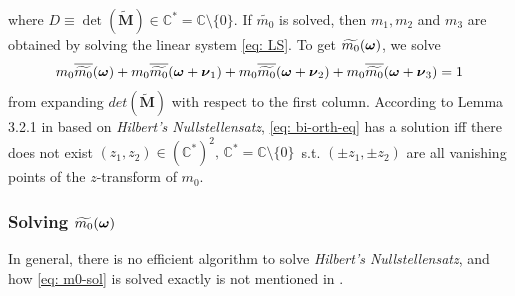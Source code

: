 where $ D \equiv \det(\widetilde{\mathbf{M}})\in \mathbb{C}^* = \mathbb{C}\setminus\{0\}$.
If $\widetilde{m_0}$ is solved, then $m_1,m_2$ and $m_3$ are obtained by solving the linear system \eqref{eq: LS}.
To get $\widetilde{m_{0}}(\boldsymbol{\omega})$, we solve 
\begin{align}\label{eq: bi-orth-eq}
m_0\overline{\widetilde{m_{0}}}(\boldsymbol{\omega}) + m_0\overline{\widetilde{m_{0}}}(\boldsymbol{\omega} + \boldsymbol{\nu}_{1}) + m_0\overline{\widetilde{m_{0}}}(\boldsymbol{\omega} + \boldsymbol{\nu}_{2}) + m_0\overline{\widetilde{m_{0}}}(\boldsymbol{\omega} + \boldsymbol{\nu}_{3}) = 1
\end{align}
from expanding $det(\widetilde{\mathbf{M}})$ with respect to the first column.
According to Lemma 3.2.1 in \cite{cohen1993compactly} based on {\it Hilbert's Nullstellensatz}, \eqref{eq: bi-orth-eq} has a solution iff there does not exist $(z_1,z_2)\in (\mathbb{C}^*)^2,\, \mathbb{C}^* = \mathbb{C}\setminus\{0\}$\, s.t. $(\pm z_1,\pm z_2)$ are all 
vanishing points of the $z$-transform of $m_0$.

\subsubsection{Solving $\widetilde{m_{0}}(\boldsymbol{\omega})$}
In general, there is no efficient algorithm to solve {\it Hilbert's Nullstellensatz}, and how \eqref{eq: m0-sol} is solved exactly is not mentioned in \cite{cohen1993compactly}.

